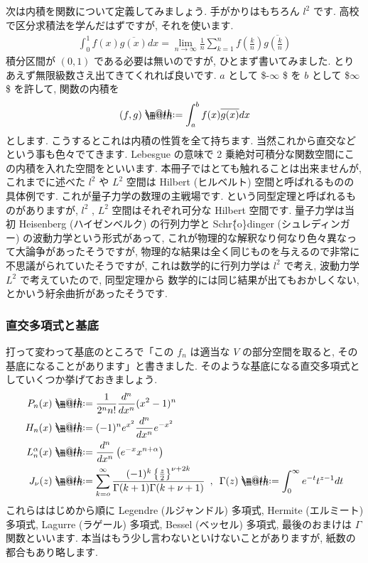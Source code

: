 \documentclass[openany, a4paper, oneside]{book}
\makeatletter
\newcommand*{\defeq}{\mathrel{\rlap{%
\raisebox{0.3ex}{$\m@th\cdot$}}%
\raisebox{-0.3ex}{$\m@th\cdot$}}%
=}
\theoremstyle{break}
\theoremstyle{breakdefn}
\makeatother
\begin{document}
次は内積を関数について定義してみましょう. 手がかりはもちろん $l^2$ です.
高校で区分求積法を学んだはずですが, それを使います.
\begin{align}
\int _{0}^1 f (x)\overline{g (x)}dx
=
\lim_{n \to \infty }\frac{1}{n}\sum_{k=1}^{n}f\left ( \frac{k}{n}\right) \overline{g\left ( \frac{k}{n}\right)}
\end{align}
積分区間が $(0,1)$ である必要は無いのですが, ひとまず書いてみました.
とりあえず無限級数さえ出てきてくれれば良いです.  $a$ として \$-$\infty$ \$ を $b$ として \$$\infty$ \$ を許して,
関数の内積を
\begin{align}
(f,g) \defeq \int_a^b f (x)\overline{g (x)}dx
\end{align}
とします. こうするとこれは内積の性質を全て持ちます.
当然これから直交などという事も色々でてきます.
Lebesgue の意味で 2 乗絶対可積分な関数空間にこの内積を入れた空間をといいます.
本冊子ではとても触れることは出来ませんが, これまでに述べた $l^2$ や $L^2$ 空間は
Hilbert (ヒルベルト) 空間と呼ばれるものの具体例です.
これが量子力学の数理の主戦場です.
という同型定理と呼ばれるものがありますが,
 $l^2$ ,  $L^2$ 空間はそれぞれ可分な Hilbert 空間です.
量子力学は当初 Heisenberg (ハイゼンベルク) の行列力学と Schr\"\{o\}dinger (シュレディンガー) の波動力学という形式があって,
これが物理的な解釈なり何なり色々異なって大論争があったそうですが,
物理的な結果は全く同じものを与えるので非常に不思議がられていたそうですが,
これは数学的に行列力学は $l^2$ で考え, 波動力学 $L^2$ で考えていたので, 同型定理から
数学的には同じ結果が出てもおかしくない, とかいう紆余曲折があったそうです.
\subsubsection{直交多項式と基底}
\label{sec-4-3-2-10-5}

打って変わって基底のところで「この $f_n$ は適当な $V$ の部分空間を取ると, その基底になることがあります」と書きました.
そのような基底になる直交多項式としていくつか挙げておきましょう.
\begin{align}
P_n (x) &\defeq \frac{1}{2^n n!}\frac{d^n}{dx^n}(x^2-1)^n \\
H_n (x) &\defeq (-1)^n e^{x^2} \frac{d^n}{dx^n}e^{-x^2} \\
L_n^{\alpha}(x) &\defeq \frac{d^n}{dx^n}\left ( e^{-x} x^{n + \alpha} \right) \\
J_{\nu }(z) &\defeq \sum_{k=o}^{\infty} \frac{(-1)^k \left \{ \frac{z}{2} \right \}^{\nu + 2k}}
{\Gamma (k + 1) \Gamma (k + \nu +1)}
\,\,\, , \,\,\, \Gamma (z) \defeq \int_0^{\infty}e^{-t}t^{z-1}dt
\end{align}
これらははじめから順に Legendre (ルジャンドル) 多項式, Hermite (エルミート) 多項式,
Lagurre (ラゲール) 多項式, Bessel (ベッセル) 多項式, 最後のおまけは $\Gamma$ 関数といいます.
本当はもう少し言わないといけないことがありますが, 紙数の都合もあり略します.
\end{document}
